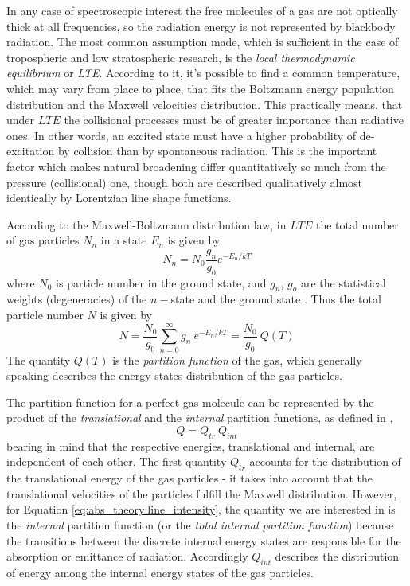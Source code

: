 In any case of spectroscopic interest the free molecules of a gas are
not optically thick at all frequencies, so the radiation energy is not
represented by blackbody radiation. The most common assumption made,
which is sufficient in the case of tropospheric and low stratospheric
research, is the {\textit{local thermodynamic equilibrium}\nocorr} or
{\textit{LTE}\nocorr}. According to it, it's possible to find a common temperature,
which may vary from place to place, that fits the Boltzmann energy
population distribution and the Maxwell velocities distribution.
This practically means, that under $LTE$ the collisional processes
must be of greater importance than radiative ones. In other words,
an excited state must have a higher probability of de-excitation by
collision than by spontaneous radiation. This is the important
factor which makes natural broadening differ quantitatively so much
from the pressure (collisional) one, though both are described
qualitatively almost identically by Lorentzian line shape
functions.

According to the Maxwell-Boltzmann distribution law, in $LTE$ the total number
of gas particles $N_n$  in a state $E_n$ is given by 
\begin{equation}\label{eq:abs_theory:maxwell_distribution2}
 N_n=N_0\frac{g_n}{g_0}e^{-E_n/kT}
\end{equation}
where $N_0$ is particle number in the ground state, and $g_n$, $g_o$
are the statistical weights (degeneracies) of the $n-$state and the
ground state \citep{gordyandcook:70}. Thus the total particle number $N$ is given by
\begin{equation}\label{eq:abs_theory:total_part_number}
 N=\frac{N_0}{g_0}\sum_{n=0}^\infty g_n~e^{-E_n/kT}=\frac{N_0}{g_0}~Q(T)
\end{equation}
The quantity $Q(T)$ is the {\it{partition function}\nocorr} of the
gas, which generally speaking describes the energy states distribution
of the gas particles. 

The partition function for a perfect gas molecule can be represented
by the product of the {\it{translational}\nocorr} and the
{\it{internal}\nocorr} partition functions, as defined in \citet{herzberg:45},
\begin{equation}\label{eq:abs_theory:partition_f_general}
 Q  =  Q_{tr}~Q_{int}
\end{equation}
bearing in mind that the respective energies, translational and
internal, are independent of each other. The first quantity $Q_{tr}$ accounts
for the distribution of the translational energy of the gas particles
- it takes into account that the translational velocities of the
particles fulfill the Maxwell distribution. However, for Equation
\ref{eq:abs_theory:line_intensity}, the quantity we are interested in
is the {\it{internal}\nocorr} partition function (or the {\it{total internal
partition function}\nocorr}) because the transitions between the discrete
internal energy states are responsible for the absorption or emittance
of radiation. Accordingly $Q_{int}$ describes the distribution of energy among
the internal energy states of the gas particles.

